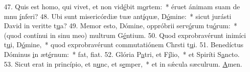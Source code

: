47. Quis est homo, qui vivet, et non vid\uline{é}bit m\uline{o}rtem:~* éruet ánimam suam de mnu \uline{í}nferi?
48. Ubi sunt misericórdiæ tuæ ant\uline{í}quæ, D\uline{ó}mine:~* sicut jurásti David in veritte t\uline{u}a?
49. Memor esto, Dómine, oppróbrii serv\uline{ó}rum tu\uline{ó}rum:~* (quod contínui in sinu meo) multrum G\uline{é}ntium.
50. Quod exprobravérunt inimíci t\uline{u}i, D\uline{ó}mine,~* quod exprobravérunt commutatiónem Chrsti t\uline{u}i.
51. Benedíctus Dóminus \uline{i}n æt\uline{é}rnum:~* fat, f\uline{i}at.
52. Glória P\uline{a}tri, et F\uline{í}lio,~* et Spiríti S\uline{a}ncto.
53. Sicut erat in princípio, et n\uline{u}nc, et s\uline{e}mper,~* et in sǽcula sæculrum. \uline{A}men.
